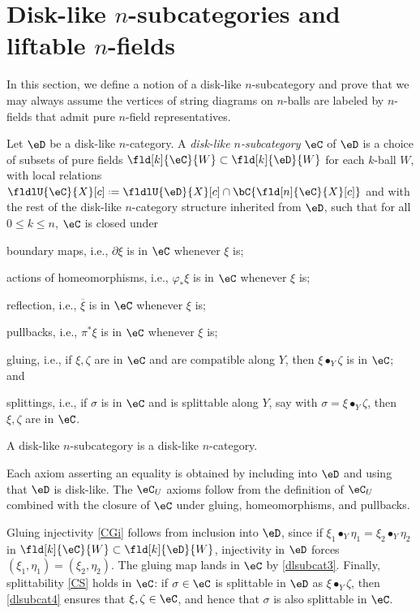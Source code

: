 \documentclass[12pt,reqno]{amsart}
\newcommand{\C}{\eC}
\newcommand{\D}{\eD}
\newcommand{\blt}{\bullet}
\newcommand{\fcj}[1]{\overline{#1}}
\newcommand{\defn}[1]{\emph{#1}}
\DeclareRobustCommand{\coloneq}{\mathrel{\vcenter{\baselineskip0.5ex\lineskiplimit0pt\hbox{\scriptsize{\upshape.}}\hbox{\scriptsize{\upshape.}}}}=}
\newcommand{\lU}[1]{#1_U}
\begin{document}
\section{Disk-like \texorpdfstring{$n$}{n}-subcategories and liftable \texorpdfstring{$n$}{n}-fields}
\label{sec:liftable}
In this section, we define a notion of a disk-like $n$-subcategory and prove that we may always assume the vertices of string diagrams on $n$-balls are labeled by $n$-fields that admit pure $n$-field representatives. 

\begin{definition}
\label{def:disk-like subcategory}
Let $\D$ be a disk-like $n$-category. A \defn{disk-like $n$-subcategory} $\C$ of $\D$ is a choice of subsets of pure fields $\fld[k]{\C}{W} \subset \fld[k]{\D}{W}$ for each $k$-ball $W$, with local relations $\fldlU{\C}{X}[ c] \coloneq \fldlU{\D}{X}[ c] \cap \bC\{\fld[n]{\C}{X}[ c]\}$ and with the rest
of the disk-like $n$-category structure inherited from $\D$, such that for all $0 \leq k \leq n$, $\C$ is closed under
\begin{lst}
   \item boundary maps, i.e., $\partial\xi$ is in $\C$ whenever $\xi$ is;
   \item actions of homeomorphisms, i.e., $\varphi_*\xi$ is in $\C$ whenever $\xi$ is;
   \item reflection, i.e., $\fcj{\xi}$ is in $\C$ whenever $\xi$ is;
   \item pullbacks, i.e., $\pi^*\xi$ is in $\C$ whenever $\xi$ is;
   \item\label{dlsubcat3} gluing, i.e., if $\xi, \zeta$ are in $\C$ and are compatible along $Y$, then $\xi\blt_Y\zeta$ is in $\C$; and
   \item\label{dlsubcat4} splittings, i.e., if $\sigma$ is in $\C$ and is splittable along $Y$, say with $\sigma=\xi \blt_Y \zeta$, then $\xi, \zeta$ are in $\C$.
\end{lst}
\end{definition}

\begin{lemma}
\label{def:disk-like subcategory-proof}
A disk-like $n$-subcategory is a disk-like $n$-category.
\end{lemma}

\begin{pf}
Each axiom asserting an equality is obtained by including into $\D$ and using that $\D$ is disk-like. The $\lU{\C}$ axioms follow from the definition of $\lU{\C}$ combined with the closure of $\C$ under gluing, homeomorphisms, and pullbacks.

Gluing injectivity \ref{CGi} follows from inclusion into $\D$, since if $\xi_1 \blt_Y \eta_1 = \xi_2 \blt_Y \eta_2$ in $\fld[k]{\C}{W} \subset \fld[k]{\D}{W}$, injectivity in $\D$ forces $(\xi_1,\eta_1)=(\xi_2,\eta_2)$. The gluing map lands in $\C$ by \ref{dlsubcat3}. Finally, splittability \ref{CS} holds in $\C$: if $\sigma \in \C$ is splittable in $\D$ as $\xi \bullet_Y \zeta$, then \ref{dlsubcat4} ensures that $\xi,\zeta \in \C$, and hence that $\sigma$ is also splittable in $\C$.
\end{pf}
\end{document}
